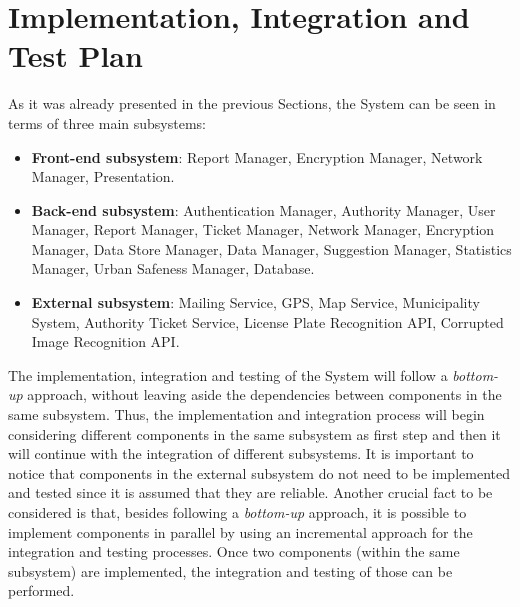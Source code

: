 \section{Implementation, Integration and Test Plan}

As it was already presented in the previous Sections, the System can be seen in terms of three main subsystems:
\begin{itemize}
\item \textbf{Front-end subsystem}: Report Manager, Encryption Manager, Network Manager, Presentation.
\item \textbf{Back-end subsystem}: Authentication Manager, Authority Manager, User Manager, Report Manager, Ticket Manager, Network Manager, Encryption Manager, Data Store Manager, Data Manager, Suggestion Manager, Statistics Manager, Urban Safeness Manager, Database.
\item \textbf{External subsystem}: Mailing Service, GPS, Map Service, Municipality System, Authority Ticket Service, License Plate Recognition API, Corrupted Image Recognition API. 
\end{itemize}
The implementation, integration and testing of the System will follow a \textit{bottom-up} approach, without leaving aside the dependencies between components in the same subsystem. Thus, the implementation and integration process will begin considering  different components in the same subsystem as first step and then it will continue with the integration of different subsystems.\newline
It is important to notice that components in the external subsystem do not need to be implemented and tested since it is assumed that they are reliable.\newline
Another crucial fact to be considered is that, besides following a \textit{bottom-up} approach, it is possible to implement components in parallel by using an incremental approach for the integration and testing processes. Once two components  (within the same subsystem) are implemented, the integration and testing of those can be performed.
